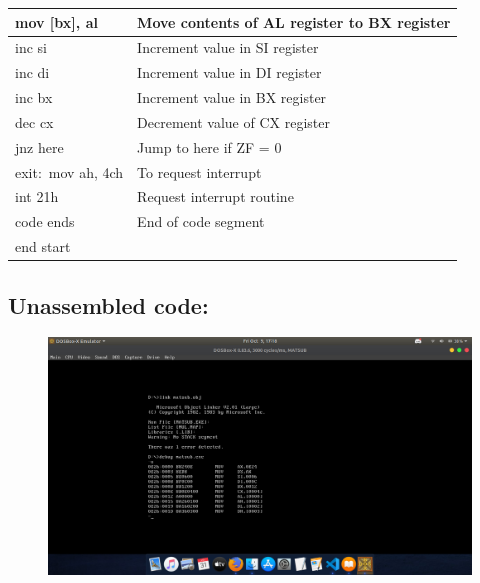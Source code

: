 \documentclass[10pt,a4paper]{article}
\begin{document}
\begin{flushleft}
\begin{table}[htb]
{\begin{tabular}{|l|l|}
\hline
mov [bx], al                                                     & Move contents of AL register to BX register   \\
\hline
inc si                                                           & Increment value in SI register                \\
\hline 
inc di                                                           & Increment value in DI register                \\
\hline
inc bx                                                           & Increment value in BX register                \\         
\hline
dec cx                                                           & Decrement value of CX register                \\
\hline
jnz here                                                         & Jump to here if ZF = 0                        \\
\hline
exit:~mov ah, 4ch                                                & To request interrupt                          \\
\hline
int 21h                                                          & Request interrupt routine                     \\ 
\hline
code ends                                                        & End of code segment                           \\
\hline
end start                                                        &                                               \\
\hline
\end{tabular}
}
\end{table}

\newpage
\subsection*{\textbf{Unassembled code:}}
\begin{figure}[h]
    \centering
    \includegraphics[trim = 100mm 60mm 200mm 120mm, clip, width = \textwidth]{Pics/MSUS.png}
\end{figure}

\end{flushleft}
\end{document}
